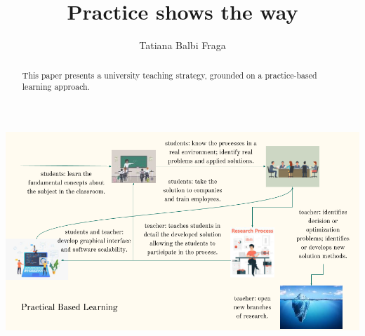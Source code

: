 \documentclass[preprint,12pt,authoryear]{elsarticle}
\begin{document}
\begin{frontmatter}



\title{Practice shows the way}


\author{Tatiana Balbi Fraga}


\begin{abstract}
This paper presents a university teaching strategy, grounded on a practice-based learning approach. 
 
\end{abstract}

\begin{graphicalabstract}
\includegraphics[width=\textwidth]{figures/graphicalAbstract.png}
\end{graphicalabstract}


\end{frontmatter}
\end{document}
